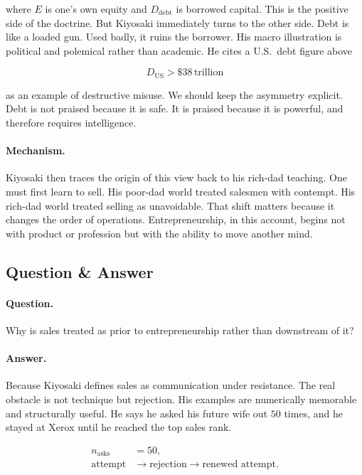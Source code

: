 where \(E\) is one's own equity and \(D_{\text{debt}}\) is borrowed capital. This is the positive side of the doctrine. But Kiyosaki immediately turns to the other side. Debt is like a loaded gun. Used badly, it ruins the borrower. His macro illustration is political and polemical rather than academic. He cites a U.S.\ debt figure above

\begin{equation}
D_{\text{US}} > \$38\,\text{trillion}
\end{equation}

as an example of destructive misuse. We should keep the asymmetry explicit. Debt is not praised because it is safe. It is praised because it is powerful, and therefore requires intelligence.

\paragraph{Mechanism.} Kiyosaki then traces the origin of this view back to his rich-dad teaching. One must first learn to sell. His poor-dad world treated salesmen with contempt. His rich-dad world treated selling as unavoidable. That shift matters because it changes the order of operations. Entrepreneurship, in this account, begins not with product or profession but with the ability to move another mind.

\subsection{Question \& Answer}

\paragraph{Question.} Why is sales treated as prior to entrepreneurship rather than downstream of it?

\paragraph{Answer.} Because Kiyosaki defines sales as communication under resistance. The real obstacle is not technique but rejection. His examples are numerically memorable and structurally useful. He says he asked his future wife out \(50\) times, and he stayed at Xerox until he reached the top sales rank.

\begin{align}
n_{\text{asks}} &= 50,\\
\text{attempt} &\to \text{rejection} \to \text{renewed attempt}.
\end{align}

